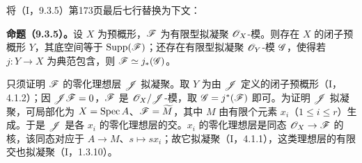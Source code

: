 将（I，9.3.5）第173页最后七行替换为下文：

\noindent\textbf{命题（9.3.5）。}设 $X$ 为预概形，$\mathscr F$ 为有限型拟凝聚 $\mathscr O_X$-模。则存在 $X$ 的闭子预概形 $Y$，其底空间等于 $\operatorname{Supp}(\mathscr F)$；还存在有限型拟凝聚 $\mathscr O_Y$-模 $\mathscr G$，使得若 $j:Y\to X$ 为典范包含，则 $\mathscr F\simeq j_*(\mathscr G)$。

只须证明 $\mathscr F$ 的零化理想层 $\mathscr J$ 拟凝聚。取 $Y$ 为由 $\mathscr J$ 定义的闭子预概形（I，4.1.2）；因 $\mathscr J\mathscr F=0$，$\mathscr F$ 是 $\mathscr O_X/\mathscr J$-模，取 $\mathscr G=j^*(\mathscr F)$ 即可。为证明 $\mathscr J$ 拟凝聚，可局部化为 $X=\operatorname{Spec} A$、$\mathscr F=\widetilde M$，其中 $M$ 由有限个元素 $x_i$（$1\leq i\leq r$）生成。于是 $\mathscr J$ 是各 $x_i$ 的零化理想层的交。$x_i$ 的零化理想层是同态 $\mathscr O_X\to\mathscr F$ 的核，该同态对应于 $A\to M$、$s\mapsto sx_i$；故它拟凝聚（I，4.1.1），这类理想层的有限交也拟凝聚（I，1.3.10）。
